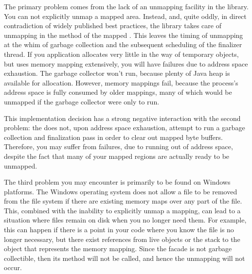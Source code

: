 The primary problem comes from the lack of an unmapping facility in the
 library. You can not explicitly unmap a mapped area. Instead,
and, quite oddly, in direct contradiction of widely published best practices, the
library takes care of unmapping in the  method of the mapped
. This leaves the timing of unmapping at the whim of garbage
collection and the subsequent scheduling of the finalizer thread. If you
application allocates very little in the way of temporary objects, but uses
memory mapping extensively, you will have failures due to address space
exhaustion. The garbage collector won't run, because plenty of Java heap is
available for allocation. However, memory mappings fail, because the process's
address space is fully consumed by older mappings, many of which would be
unmapped if the garbage collector were only to run.

This implementation decision has a strong negative interaction with the second
problem: the \jre does not, upon address space exhaustion, attempt to run a
garbage collection and finalization pass in order to clear out mapped byte
buffers. Therefore, you may suffer from  failures,
due to running out of address space, despite the fact that many of your mapped
regions are actually ready to be unmapped.

The third problem you may encounter is primarily to be found on Windows
platforms. The Windows operating system does not allow a file to be removed from
the file system if there are existing memory maps over any part of the file.
This, combined with the inability to explicitly unmap a mapping, can lead to a
situation where files remain on disk when you no longer need them. For example,
this can happen if there is a point in your code where you know the file is no
longer necessary, but there exist references from live objects or the stack to
the  object that represents the memory mapping. Since the
 facade is not garbage collectible, then its 
method will not be called, and hence the unmapping will not occur.

